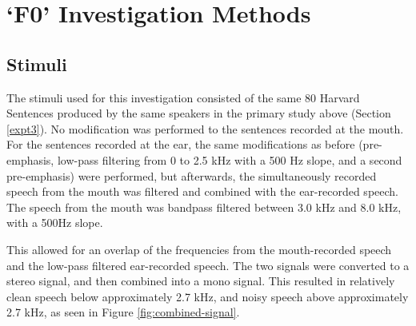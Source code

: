 

\section{`F0' Investigation Methods}
\label{F0-methods}

\subsection{Stimuli}\label{F0-stimuli}

The stimuli used for this investigation consisted of the same 80 Harvard Sentences produced by the same speakers in the primary study above (Section \ref{expt3}).
No modification was performed to the sentences recorded at the mouth.  For the sentences recorded at the ear, the same modifications as before (pre-emphasis, low-pass filtering from 0 to 2.5 kHz with a 500 Hz slope, and a second pre-emphasis) were performed, but afterwards, the simultaneously recorded speech from the mouth was filtered and combined with the ear-recorded speech.  The speech from the mouth was bandpass filtered between 3.0 kHz and 8.0 kHz, with a 500Hz slope.  

This allowed for an overlap of the frequencies from the mouth-recorded speech and the low-pass filtered ear-recorded speech.  The two signals were converted to a stereo signal, and then combined into a mono signal.  This resulted in relatively clean speech below approximately 2.7 kHz, and noisy speech above approximately 2.7 kHz, as seen in Figure \ref{fig:combined-signal}.
\DIFdelbegin %
\DIFdelend \DIFaddbegin 

